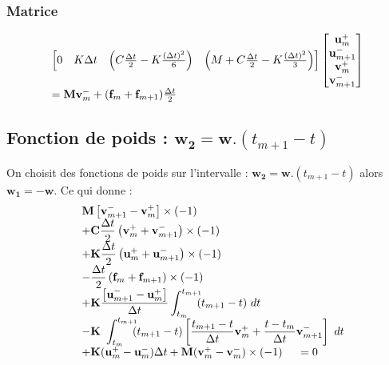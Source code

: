 \documentclass[12pt,a4paper]{report}
\begin{document}
\subsubsection{Matrice}
\begin{equation}
\begin{array}{l l}
		\begin{bmatrix}	   
		   0 
		   &K \Delta t
		   & \left( C \frac{\Delta t}{2}
		    		- K \frac{(\Delta t)^2}{6}
		     \right)
		   & \left(	M
		    		+ C \frac{\Delta t}{2}
		    		- K \frac{(\Delta t)^2}{3} 
		     \right)\\ 
		\end{bmatrix}
		\begin{bmatrix}
		   \mathbf{u}_m^+  		\\
		   \mathbf{u}_{m+1}^-  	\\
		   \mathbf{v}_m^+  		\\
		   \mathbf{v}_{m+1}^-  	\\
		\end{bmatrix}
	\\
		= \mathbf{M} \mathbf{v}_m^-
		 + (\mathbf{f}_m + \mathbf{f}_{m+1})  \frac{\Delta t}{2}
	
\end{array}
\end{equation}

\subsection{Fonction de poids : $\mathbf{w_2} = \mathbf{w}.(t_{m+1}-t)$}

On choisit des fonctions de poids sur l'intervalle : $\mathbf{w_2} = \mathbf{w}.(t_{m+1}-t)$ alors $\mathbf{w_1} = -\mathbf{w}$.
Ce qui donne :
\begin{equation}
\begin{array}{r l}
	&\displaystyle
	 \mathbf{M} 
	    	\left[ \mathbf{v}_{m+1}^- 
	    		- \mathbf{v}_m^+ \right] \times (-1)
	\\ 
	  &\displaystyle
	  +\mathbf{C} \frac{\Delta t}{2}
		\left(
			\mathbf{v}_m^+ + 
			\mathbf{v}_{m+1}^- 
		\right) \times (-1)
	\\
	  &\displaystyle
	 +\mathbf{K} \frac{\Delta t}{2}
		\left(
			\mathbf{u}_m^+ + 
			\mathbf{u}_{m+1}^- 
		\right) \times (-1)
	\\
	  &\displaystyle
	   -\frac{\Delta t}{2}
		\left(
			\mathbf{f}_m + 
			\mathbf{f}_{m+1}
		\right)  \times (-1)
	\\
	  &+\displaystyle
	    \mathbf{K}
	    	\frac{\left[ \mathbf{u}_{m+1}^- 
	    		- \mathbf{u}_m^+ \right]    }{\Delta t}			
			\int_{t_m}^{t_{m+1}} \!\!\! (t_{m+1}-t) ~dt
	\\
	  &\displaystyle	    
	    -\mathbf{K}~\int_{t_m}^{t_{m+1}} \!\!\! 	
		(t_{m+1}-t) \left[
			\frac{t_{m+1}-t}{\Delta t} \mathbf{v}_m^+ + 
			\frac{t-t_m}{\Delta t} \mathbf{v}_{m+1}^- 
			\right] ~dt
	\\
	  &+ \mathbf{K} (\mathbf{u}_m^+ - \mathbf{u}_m^-) \Delta t
	   + \mathbf{M} (\mathbf{v}_m^+ - \mathbf{v}_m^-) \times (-1)
	~~~~=0	
\end{array}
\end{equation}
\end{document}
